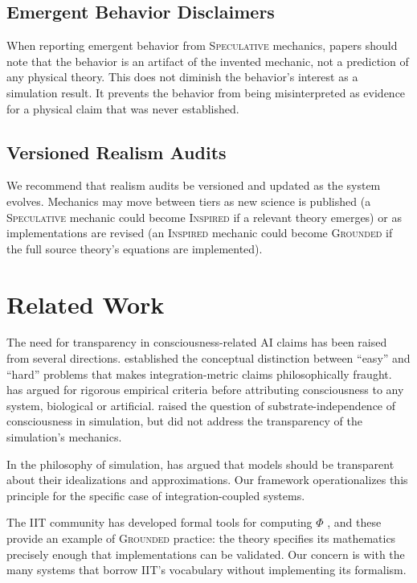 \documentclass[12pt,a4paper]{article}
\begin{document}
\subsection{Emergent Behavior Disclaimers}

When reporting emergent behavior from \textsc{Speculative}
mechanics, papers should note that the behavior is an artifact
of the invented mechanic, not a prediction of any physical
theory.  This does not diminish the behavior's interest as a
simulation result.  It prevents the behavior from being
misinterpreted as evidence for a physical claim that was never
established.

\subsection{Versioned Realism Audits}

We recommend that realism audits be versioned and updated as
the system evolves.  Mechanics may move between tiers as new
science is published (a \textsc{Speculative} mechanic could
become \textsc{Inspired} if a relevant theory emerges) or as
implementations are revised (an \textsc{Inspired} mechanic
could become \textsc{Grounded} if the full source theory's
equations are implemented).


\section{Related Work}
\label{sec:related}

The need for transparency in consciousness-related AI claims
has been raised from several directions.  \citet{chalmers1995}
established the conceptual distinction between ``easy'' and
``hard'' problems that makes integration-metric claims
philosophically fraught.  \citet{koch2019} has argued for
rigorous empirical criteria before attributing consciousness
to any system, biological or artificial.  \citet{bostrom2003}
raised the question of substrate-independence of consciousness
in simulation, but did not address the transparency of the
simulation's mechanics.

In the philosophy of simulation, \citet{winsberg2010} has
argued that models should be transparent about their
idealizations and approximations.  Our framework operationalizes
this principle for the specific case of integration-coupled
systems.

The IIT community has developed formal tools for computing
$\Phi$ \citep{tononi2004,oizumi2014,tononi2016}, and these
provide an example of \textsc{Grounded} practice: the theory
specifies its mathematics precisely enough that implementations
can be validated.  Our concern is with the many systems that
borrow IIT's vocabulary without implementing its formalism.
\end{document}
